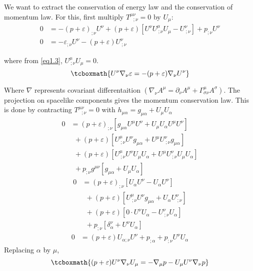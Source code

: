 \documentclass[12pt, letterpaper]{report}
\begin{document}
We want to extract the conservation of energy law and the conservation of momentum law. For this, first multiply  $T^{\mu\nu}_{\ \ \ ;\nu}=0$ by $U_\mu$:
\begin{align*}
    0 &= -(p+\varepsilon)_{;\nu} U^\nu+ (p+\varepsilon)[ U^\nu U^\mu_{\ ;\nu}U_\mu - U^\nu_{\ ;\nu}] + p_{;\nu}U^\nu\\
    0 &= -\varepsilon_{;\nu} U^\nu- (p+\varepsilon)U^\nu_{\ ;\nu}
\end{align*}

where from \cref{eq1.3}, $U^\mu_{\ ;\nu}U_\mu= 0$.
\begin{equation}
    \tcboxmath{U^\nu \nabla_\nu\varepsilon= -(p+\varepsilon)\nabla_\nu U^\nu} \label{eq1.4}
\end{equation}

Where $\nabla$ represents covariant differentaition $(\nabla_\nu A^\mu= \partial_\nu A^\mu + \Gamma^{\mu}_{\sigma \nu}A^\sigma)$. The projection on spacelike components gives the momentum conservation law. This is done by contracting  $T^{\mu\nu}_{\ \ \ ;\nu}=0$ with $h_{\mu\alpha}= g_{\mu\alpha}+U_{\mu}U_\alpha$
\begin{align*}
    0 &= (p+\varepsilon)_{;\nu}[g_{\mu\alpha}U^\mu U^\nu+U_{\mu}U_\alpha U^\mu U^\nu]\\ 
    &\ \ +(p+\varepsilon)[U^\mu_{\ ;\nu} U^\nu g_{\mu\alpha} + U^\mu U^\nu_{\ ;\nu}g_{\mu\alpha}] \\
    &\ \ +(p+\varepsilon)[U^\mu_{\ ;\nu} U^\nu U_{\mu}U_\alpha + U^\mu U^\nu_{\ ;\nu}U_{\mu}U_\alpha] \\ 
    &\ \ + p_{;\nu}g^{\mu\nu}[g_{\mu\alpha}+U_{\mu}U_\alpha]
\end{align*}
\begin{align*}
    0 &= (p+\varepsilon)_{;\nu}[U_\alpha U^\nu-U_\alpha U^\nu]\\ 
    &\ \ +(p+\varepsilon)[U^\mu_{\ ;\nu} U^\nu g_{\mu\alpha} + U_\alpha U^\nu_{\ ;\nu}] \\
    &\ \ +(p+\varepsilon)[0\cdot U^\nu U_\alpha - U^\nu_{\ ;\nu}U_\alpha] \\ 
    &\ \ + p_{;\nu}[\delta^\nu_\alpha+U^{\nu}U_\alpha]
\end{align*}
\begin{align*}
    0 &= (p+\varepsilon)U_{\alpha;\nu} U^\nu + p_{;\alpha}+p_{;\nu}U^{\nu}U_\alpha
\end{align*}
Replacing $\alpha$ by $\mu$, 
\begin{equation}
    \tcboxmath{(p+\varepsilon)U^\nu\nabla_\nu U_\mu= -\nabla_\mu p- U_\mu U^\nu \nabla_\nu p}\label{eq1.5}
\end{equation}
\end{document}
